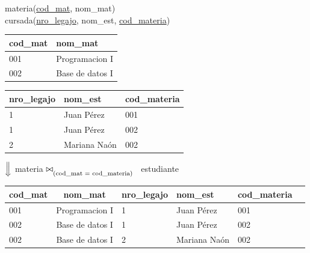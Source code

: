 \documentclass[preview]{standalone}
\begin{document}
materia(\underline{cod\_mat}, nom\_mat)\\
cursada(\underline{nro\_legajo}, nom\_est, \underline{cod\_materia})\\

\begin{center}
\begin{tabular}{| l | l | }\hline			
	cod\_mat & nom\_mat \\\hline			
	001 & Programacion I \\
	002 & Base de datos I \\\hline
\end{tabular}
\quad
\begin{tabular}{| l | l | l | }\hline			
	nro\_legajo & nom\_est & cod\_materia \\\hline			
	1 & Juan P\'erez & 001\\
	1 & Juan P\'erez & 002\\
	2 & Mariana Na\'on & 002 \\\hline
\end{tabular}
\vspace{.35cm}

$\Big\Downarrow$ materia ${\Large\bowtie_{\textsubscript{(cod\_mat = cod\_materia)}}}$ \ estudiante 
\vspace{.35cm}

\begin{tabular}{| l | c | l | l | l | l | }\hline			
	cod\_mat & nom\_mat & nro\_legajo & nom\_est & cod\_materia \\\hline			
	001 & Programacion I & 1 & Juan P\'erez & 001  \\
	002 & Base de datos I & 1 & Juan P\'erez & 002 \\
	002 & Base de datos I & 2 & Mariana Na\'on & 002 \\\hline
\end{tabular}
\end{center}
\end{document}
